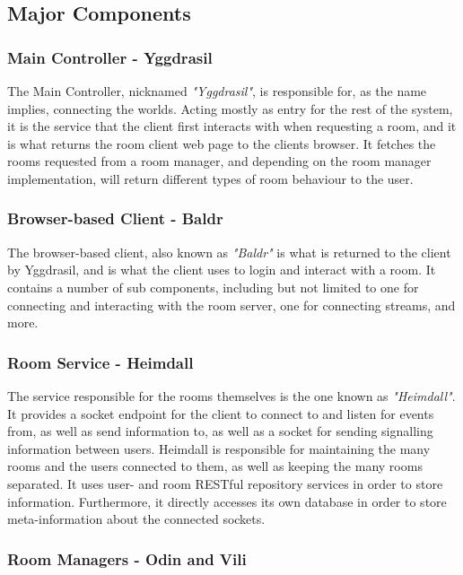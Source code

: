\subsection{Major Components}

\subsubsection{Main Controller - Yggdrasil}

The Main Controller, nicknamed \textit{"Yggdrasil"}, is responsible for, as the name implies, connecting the worlds. Acting mostly as entry for the rest of the system, it is the service that the client first interacts with when requesting a room, and it is what returns the room client web page to the clients browser. It fetches the rooms requested from a room manager, and depending on the room manager implementation, will return different types of room behaviour to the user.

\subsubsection{Browser-based Client - Baldr}

The browser-based client, also known as \textit{"Baldr"} is what is returned to the client by Yggdrasil, and is what the client uses to login and interact with a room. It contains a number of sub components, including but not limited to one for connecting and interacting with the room server, one for connecting streams, and more.

\subsubsection{Room Service - Heimdall}

The service responsible for the rooms themselves is the one known as \textit{"Heimdall"}. It provides a socket endpoint for the client to connect to and listen for events from, as well as send information to, as well as a socket for sending signalling information between users. Heimdall is responsible for maintaining the many rooms and the users connected to them, as well as keeping the many rooms separated. It uses user- and room RESTful repository services in order to store information. Furthermore, it directly accesses its own database in order to store meta-information about the connected sockets.

\subsubsection{Room Managers - Odin and Vili}

